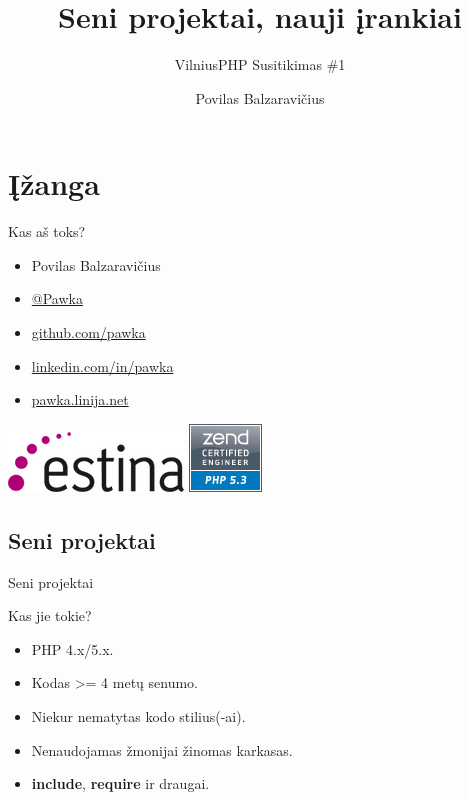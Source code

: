\documentclass[12pt,a4paper]{beamer}
\author{Povilas Balzaravičius}
\title{Seni projektai, nauji įrankiai}
\subtitle{VilniusPHP Susitikimas \#1}
\begin{document}
\begin{frame}
	\titlepage
\end{frame}

\section{Įžanga}
\begin{frame}{Kas aš toks?}
    \begin{itemize}
        \item Povilas Balzaravičius
        \item \href{https://twitter.com/pawka}{@Pawka}
        \item \href{https://github.com/pawka}{github.com/pawka}
        \item \href{https://linkedin.com/in/pawka}{linkedin.com/in/pawka}
        \item \href{http://pawka.linija.net}{pawka.linija.net}
    \end{itemize}
    \begin{center}
        \includegraphics[scale=0.4]{img/estina.png}
        \hskip1cm
        \includegraphics[scale=0.4]{img/zce-php5-3-logo.png}
    \end{center}
\end{frame}

\subsection{Seni projektai}
\begin{frame}[fragile]

    {\Huge Seni projektai}
\end{frame}

\begin{frame}{Kas jie tokie?}
    \begin{itemize}
        \item PHP 4.x/5.x.
        \item Kodas >= 4 metų senumo.
        \item Niekur nematytas kodo stilius(-ai).
        \item Nenaudojamas žmonijai žinomas karkasas.
        \item \textbf{include}, \textbf{require} ir draugai.
    \end{itemize}
\end{frame}
\end{document}
